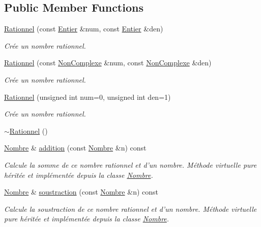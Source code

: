 \subsection*{\-Public \-Member \-Functions}
\begin{DoxyCompactItemize}
\item 
\hyperlink{classRationnel_a4a0ffcb25f5a20c6dc4da18c0c80110d}{\-Rationnel} (const \hyperlink{classEntier}{\-Entier} \&num, const \hyperlink{classEntier}{\-Entier} \&den)
\begin{DoxyCompactList}\small\item\em \-Crée un nombre rationnel. \end{DoxyCompactList}\item 
\hyperlink{classRationnel_aa60d0952f71e99dded642d42e9dffa3f}{\-Rationnel} (const \hyperlink{classNonComplexe}{\-Non\-Complexe} \&num, const \hyperlink{classNonComplexe}{\-Non\-Complexe} \&den)
\begin{DoxyCompactList}\small\item\em \-Crée un nombre rationnel. \end{DoxyCompactList}\item 
\hyperlink{classRationnel_ab5ce094e3a57591f7b7fa6f634490d24}{\-Rationnel} (unsigned int num=0, unsigned int den=1)
\begin{DoxyCompactList}\small\item\em \-Crée un nombre rationnel. \end{DoxyCompactList}\item 
\hyperlink{classRationnel_ab0257aa2fd1b258506ec6d2a268612c6}{$\sim$\-Rationnel} ()
\item 
\hyperlink{classNombre}{\-Nombre} \& \hyperlink{classRationnel_a0b04b9aa79b75d4a9af8cb8b79f753a7}{addition} (const \hyperlink{classNombre}{\-Nombre} \&n) const 
\begin{DoxyCompactList}\small\item\em \-Calcule la somme de ce nombre rationnel et d'un nombre. \-Méthode virtuelle pure héritée et implémentée depuis la classe \hyperlink{classNombre}{\-Nombre}. \end{DoxyCompactList}\item 
\hyperlink{classNombre}{\-Nombre} \& \hyperlink{classRationnel_a568a44d3bb7c39ec7096a939ce067f8f}{soustraction} (const \hyperlink{classNombre}{\-Nombre} \&n) const 
\begin{DoxyCompactList}\small\item\em \-Calcule la soustraction de ce nombre rationnel et d'un nombre. \-Méthode virtuelle pure héritée et implémentée depuis la classe \hyperlink{classNombre}{\-Nombre}. \end{DoxyCompactList}\item 

\end{DoxyCompactItemize}

